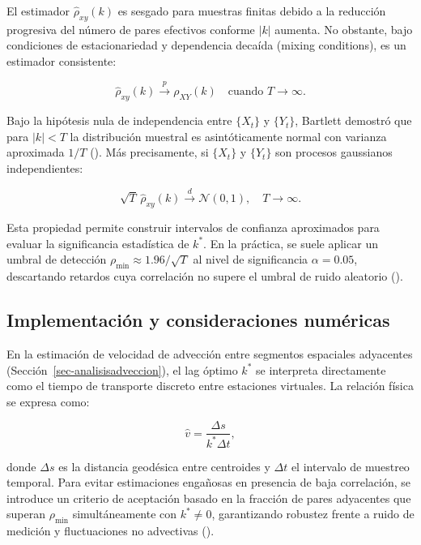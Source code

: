 \documentclass[
  spanish,
  us-letterpaper,
]{scrreprt}
\numberwithin{equation}{section}
\begin{document}
El estimador \(\hat{\rho}_{xy}(k)\) es sesgado para muestras finitas
debido a la reducción progresiva del número de pares efectivos conforme
\(|k|\) aumenta. No obstante, bajo condiciones de estacionariedad y
dependencia decaída (mixing conditions), es un estimador consistente:

\[
\hat{\rho}_{xy}(k) \xrightarrow{p} \rho_{XY}(k) \quad \text{cuando } T \to \infty.
\]

Bajo la hipótesis nula de independencia entre \(\{X_t\}\) y \(\{Y_t\}\),
Bartlett demostró que para \(|k| < T\) la distribución muestral es
asintóticamente normal con varianza aproximada \(1/T\)
(). Más
precisamente, si \(\{X_t\}\) y \(\{Y_t\}\) son procesos gaussianos
independientes:

\[
\sqrt{T} \, \hat{\rho}_{xy}(k) \xrightarrow{d} \mathcal{N}(0, 1), \quad T \to \infty.
\]

Esta propiedad permite construir intervalos de confianza aproximados
para evaluar la significancia estadística de \(k^*\). En la práctica, se
suele aplicar un umbral de detección
\(\rho_{\min} \approx 1.96/\sqrt{T}\) al nivel de significancia
\(\alpha = 0.05\), descartando retardos cuya correlación no supere el
umbral de ruido aleatorio ().

\subsection{Implementación y consideraciones
numéricas}\label{implementaciuxf3n-y-consideraciones-numuxe9ricas}

En la estimación de velocidad de advección entre segmentos espaciales
adyacentes (Sección~\ref{sec-analisisadveccion}), el lag óptimo \(k^*\)
se interpreta directamente como el tiempo de transporte discreto entre
estaciones virtuales. La relación física se expresa como:

\[
\hat{v} = \frac{\Delta s}{k^* \Delta t},
\]

donde \(\Delta s\) es la distancia geodésica entre centroides y
\(\Delta t\) el intervalo de muestreo temporal. Para evitar estimaciones
engañosas en presencia de baja correlación, se introduce un criterio de
aceptación basado en la fracción de pares adyacentes que superan
\(\rho_{\min}\) simultáneamente con \(k^* \neq 0\), garantizando
robustez frente a ruido de medición y fluctuaciones no advectivas
().
\end{document}
